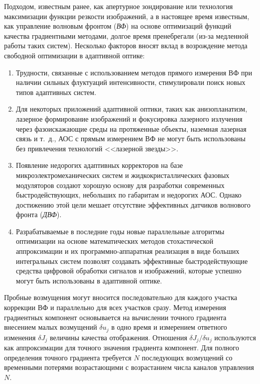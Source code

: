\documentclass[pscyr]{hedwork}
\newcommand{\de}{\delta}
\begin{document}
Подходом, известным ранее, как апертурное зондирование или технология
максимизации функции резкости изображений, а в настоящее время известным, как
управление волновым фронтом (\emph{ВФ}) на основе оптимизаций функций качества
градиентными методами, долгое время пренебрегали (из-за медленной работы таких
систем). Несколько факторов вносят вклад в возрождение метода свободной
оптимизации в адаптивной оптике:
\begin{enumerate}
  \item Трудности, связанные с использованием методов прямого измерения ВФ при
    наличии сильных флуктуаций интенсивности, стимулировали поиск новых типов
    адаптивных систем.
  \item Для некоторых приложений адаптивной оптики, таких как анизопланатизм,
    лазерное формирование изображений и фокусировка лазерного излучения через
    фазоискажающие среды на протяженные объекты, наземная лазерная связь и т.~д.,
    АОС с прямым измерением ВФ не могут быть использованы без привлечения
    технологий <<лазерной звезды>>.
  \item Появление недорогих адаптивных корректоров на базе
    микроэлектромеханических систем и жидкокристаллических фазовых модуляторов
    создают хорошую основу для разработки современных быстродействующих,
    небольших по габаритам и недорогих АОС. Однако достижению этой цели мешает
    отсутствие эффективных датчиков волнового фронта (\emph{ДВФ}).
  \item Разрабатываемые в последние годы новые параллельные алгоритмы
    оптимизации на основе математических методов стохастической аппроксимации и
    их программно-аппаратная реализация в виде больших интегральных систем
    позволят создавать эффективные быстродействующие средства цифровой обработки
    сигналов и изображений, которые успешно могут быть использованы в адаптивной
    оптике.
\end{enumerate}

Пробные возмущения могут вносится последовательно для каждого участка коррекции
ВФ и параллельно для всех участков сразу. Метод измерения градиентных компонент
основывается на вычислении точного градиента внесением малых возмущений 
\( \de u_j \) в одно время и измерением ответного изменения \( \de J_j \)
величины качества отображения. Отношения \( \de J_j / \de u_j \)
используются как аппроксимации для точного значения градиента компонент. Для
полного определения точного градиента требуется \( N \) последующих возмущений
со временными потерями возрастающими с возрастанием числа каналов управления
\( N \).
\end{document}

